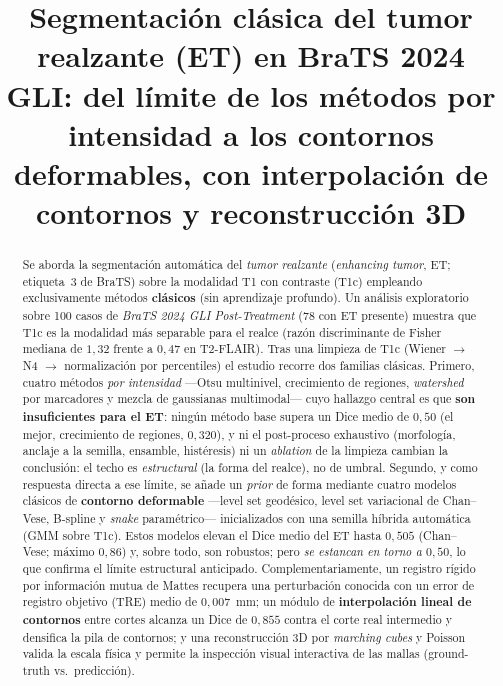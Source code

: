 \documentclass[conference]{IEEEtran}
\title{Segmentación clásica del tumor realzante (ET) en BraTS 2024 GLI:
del límite de los métodos por intensidad a los contornos deformables,
con interpolación de contornos y reconstrucción 3D}
\author{\IEEEauthorblockN{Abel Albuez, Victoria Acero y Santiago Gil}
\IEEEauthorblockA{Maestría en Ingeniería de Sistemas y Computación\\
Pontificia Universidad Javeriana, Bogotá D.C., Colombia\\
Procesamiento de Imágenes Médicas \quad 2026\\
Repositorio: \url{https://github.com/AbelAlbuez/medical-image-processing}}}
\begin{document}
\maketitle

\begin{abstract}
Se aborda la segmentación automática del \emph{tumor realzante}
(\textit{enhancing tumor}, ET; etiqueta~3 de BraTS) sobre la
modalidad T1 con contraste (T1c) empleando exclusivamente métodos
\textbf{clásicos} (sin aprendizaje profundo). Un análisis exploratorio
sobre 100 casos de \textit{BraTS 2024 GLI Post-Treatment} (78 con ET
presente) muestra que T1c es la modalidad más separable para el realce
(razón discriminante de Fisher mediana de $1{,}32$ frente a $0{,}47$ en
T2-FLAIR). Tras una limpieza de T1c (Wiener $\rightarrow$ N4
$\rightarrow$ normalización por percentiles) el estudio recorre dos
familias clásicas. Primero, cuatro métodos \emph{por intensidad}
---Otsu multinivel, crecimiento de regiones, \textit{watershed} por
marcadores y mezcla de gaussianas multimodal--- cuyo hallazgo central es
que \textbf{son insuficientes para el ET}: ningún método base supera un
Dice medio de $0{,}50$ (el mejor, crecimiento de regiones, $0{,}320$), y
ni el post-proceso exhaustivo (morfología, anclaje a la semilla, ensamble,
histéresis) ni un \emph{ablation} de la limpieza cambian la conclusión: el
techo es \emph{estructural} (la forma del realce), no de umbral. Segundo,
y como respuesta directa a ese límite, se añade un \emph{prior} de forma
mediante cuatro modelos clásicos de \textbf{contorno deformable}
---level set geodésico, level set variacional de Chan--Vese, B-spline y
\textit{snake} paramétrico--- inicializados con una semilla híbrida
automática (GMM sobre T1c). Estos modelos elevan el Dice medio del ET
hasta $0{,}505$ (Chan--Vese; máximo $0{,}86$) y, sobre todo, son
robustos; pero \emph{se estancan en torno a $0{,}50$}, lo que confirma el
límite estructural anticipado. Complementariamente, un registro rígido
por información mutua de Mattes recupera una perturbación conocida con un
error de registro objetivo (TRE) medio de $0{,}007$~mm; un módulo de
\textbf{interpolación lineal de contornos} entre cortes alcanza un Dice de
$0{,}855$ contra el corte real intermedio y densifica la pila de
contornos; y una reconstrucción 3D por \textit{marching cubes} y Poisson
valida la escala física y permite la inspección visual interactiva de las
mallas (ground-truth vs.\ predicción).
\end{abstract}
\end{document}
